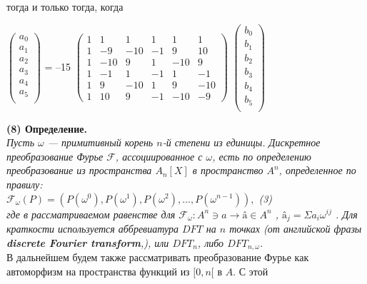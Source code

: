 \documentclass{mai_book}
\begin{document}
тогда и только тогда, когда\\
\begin{center}
$\begin{pmatrix}
a_0\\
a_1\\
a_2\\
a_3\\
a_4\\
a_5\\
\end{pmatrix}$ = --15
$\begin{pmatrix}
1 & 1 & 1 & 1 & 1 & 1\\
1 & -9 & -10 & -1 & 9 & 10\\
1 & -10 & 9 & 1 & -10 & 9\\
1 & -1 & 1 & -1 &1 & -1\\
1 & 9 & -10 & 1 & 9 & -10\\
1 & 10 & 9 & -1 & -10 & -9
\end{pmatrix}$
$\begin{pmatrix}
b_0\\
b_1\\
b_2\\
b_3\\
b_4\\
b_5\\
\end{pmatrix}$
\end{center}\bigskip 
\textbf{(8) Определение.} \bigskip \\
\textit{Пусть $\omega$ — примитивный корень $n$-й степени из единицы. 
Дискретное преобразование Фурье $\mathcal{F} $, ассоциированное с $\omega$, есть по 
определению преобразование из пространства $A_n [X]$ в пространство $A^n$,
определенное по правилу:\\
\vspace{0pt}\hspace{100pt}$\mathcal{F}_{\omega} (P) = (P({\omega}^0),P({\omega}^1),P({\omega}^2),...,P({\omega}^{n-1})), $
\hspace{50pt}(3)\smallskip\\
где в рассматриваемом равенстве для $ {\mathcal{F}}_{\omega} : A^n \ni a \longrightarrow \text{â}  \in A^n $ ,
$\text{â}_j = \Sigma a_i \omega^{ij}$ . Для краткости используется аббревиатура $DFT$ на $n$ 
точках (от английской фразы \textbf{discrete Fourier transform},), или $DFT_n$,
либо $DFT_{n,\omega}$.}\bigskip \\
В дальнейшем будем также рассматривать преобразование Фурье
как автоморфизм на пространства функций из $[0, n[$ в $A$. С этой 
\end{document}
